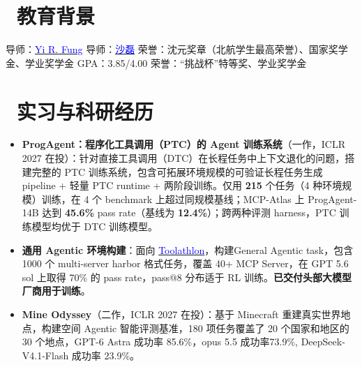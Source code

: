 \documentclass{resume}
\begin{document}



\section{\faGraduationCap\ 教育背景}
导师：\href{https://mayrfung.github.io/}{\textcolor{blue}{Yi R. Fung}}
导师：\href{https://shalei120.github.io/}{\textcolor{blue}{沙磊}} \quad\textbar\quad 荣誉：沈元奖章（北航学生最高荣誉）、国家奖学金、学业奖学金
GPA：3.85/4.00 \quad\textbar\quad 荣誉：“挑战杯”特等奖、学业奖学金

\section{\faUsers\ 实习与科研经历}

\begin{itemize}
  \item \textbf{ProgAgent：程序化工具调用（PTC）的 Agent 训练系统}（一作，ICLR 2027 在投）：针对直接工具调用（DTC）在长程任务中上下文退化的问题，搭建完整的 PTC 训练系统，包含可拓展环境规模的可验证长程任务生成 pipeline + 轻量 PTC runtime + 两阶段训练。仅用 \textbf{215} 个任务（4 种环境规模）训练，在 4 个 benchmark 上超过同规模基线；MCP-Atlas 上 ProgAgent-14B 达到 \textbf{45.6\%} pass rate（基线为 \textbf{12.4\%}）；跨两种评测 harness，PTC 训练模型均优于 DTC 训练模型。
\end{itemize}

\begin{itemize}
  \item \textbf{通用 Agentic 环境构建}：面向 \href{https://github.com/hkust-nlp/Toolathlon}{\textcolor{blue}{Toolathlon}}，构建General Agentic task，包含 1000 个 multi-server harbor 格式任务，覆盖 40+ MCP Server，在 GPT 5.6 sol 上取得 70\% 的 pass rate，pass@8 分布适于 RL 训练。\textbf{已交付头部大模型厂商用于训练}。
  \item \textbf{Mine Odyssey}（二作，ICLR 2027 在投）：基于 Minecraft 重建真实世界地点，构建空间 Agentic 智能评测基准，180 项任务覆盖了 20 个国家和地区的30 个地点，GPT-6 Astra 成功率 85.6\%，opus 5.5 成功率73.9\%, DeepSeek-V4.1-Flash 成功率 23.9\%。
\end{itemize}
\end{document}
